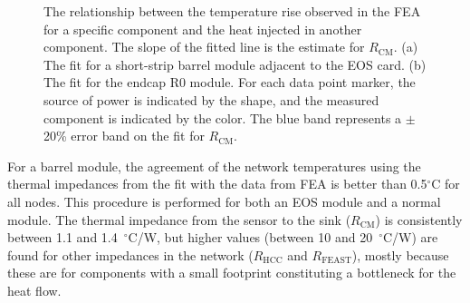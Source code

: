 \begin{figure}[ht]
\centering
{}\quad\quad
{}
\caption{The relationship between the temperature rise observed in the FEA for a specific component and the heat injected in another component. The slope of the fitted line is the estimate for $R_\text{CM}$.
(a) The fit for a short-strip barrel module adjacent to the EOS card. (b) The fit for the endcap R0 module.
For each data point marker, the source of power is indicated by the shape, and the measured component is indicated
by the color.
The blue band represents a $\pm$20\% error band on the fit for $R_\text{CM}$.
}
\label{fig:solving_for_Rcm}
\end{figure}


For a barrel module, the agreement of the network temperatures using the thermal impedances from the fit with the data from FEA is better than 0.5$^\circ$C for all nodes. This procedure is performed for both an EOS module and a normal module. The thermal impedance from the sensor to the sink ($R_\text{CM}$) is consistently between 1.1 and 1.4~$^\circ$C/W, but higher values (between 10 and 20~$^\circ$C/W) are found for other impedances in the network ($R_\text{HCC}$ and $R_\text{FEAST}$), mostly because these are for components with a small footprint constituting a bottleneck for the heat flow.

